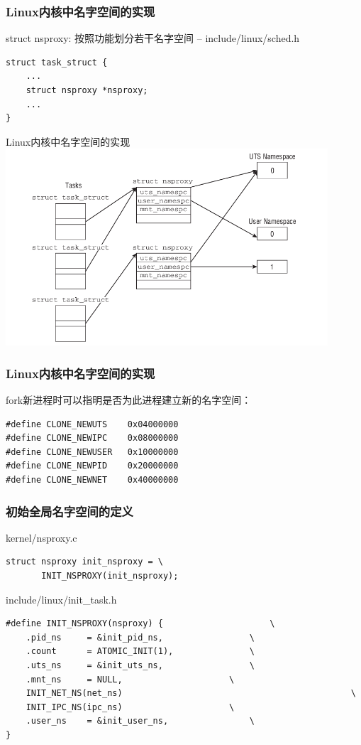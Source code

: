 \documentclass[xcolor=svgnames]{beamer}
\begin{document}
\begin{CJK*}{UTF8}{gbsn}
\begin{frame}[fragile]
\frametitle{Linux内核中名字空间的实现}
\begin{block}{struct nsproxy: 按照功能划分若干名字空间 -- include/linux/sched.h}
\begin{verbatim}
struct task_struct {
    ...
    struct nsproxy *nsproxy;
    ...
}
\end{verbatim}
\end{block}
\end{frame}

\begin{frame}{Linux内核中名字空间的实现}
\includegraphics[width=0.9\textwidth]{ns_impl.png}
\end{frame}

\begin{frame}[fragile]
\frametitle{Linux内核中名字空间的实现}
\begin{block}{fork新进程时可以指明是否为此进程建立新的名字空间：}
\begin{verbatim}
#define CLONE_NEWUTS    0x04000000  
#define CLONE_NEWIPC    0x08000000 
#define CLONE_NEWUSER   0x10000000
#define CLONE_NEWPID    0x20000000
#define CLONE_NEWNET    0x40000000 
\end{verbatim}
\end{block}
\end{frame}

\begin{frame}[fragile]
\frametitle{初始全局名字空间的定义}
\begin{block}{kernel/nsproxy.c}
\begin{verbatim}
struct nsproxy init_nsproxy = \
       INIT_NSPROXY(init_nsproxy);
\end{verbatim}
\end{block}
\begin{block}{include/linux/init\_task.h}
\begin{verbatim}
#define INIT_NSPROXY(nsproxy) {                     \
    .pid_ns     = &init_pid_ns,                 \
    .count      = ATOMIC_INIT(1),               \
    .uts_ns     = &init_uts_ns,                 \
    .mnt_ns     = NULL,                     \
    INIT_NET_NS(net_ns)                                             \
    INIT_IPC_NS(ipc_ns)                     \
    .user_ns    = &init_user_ns,                \
}


\end{verbatim}
\end{block}
\end{frame}
\end{CJK*}
\end{document}
